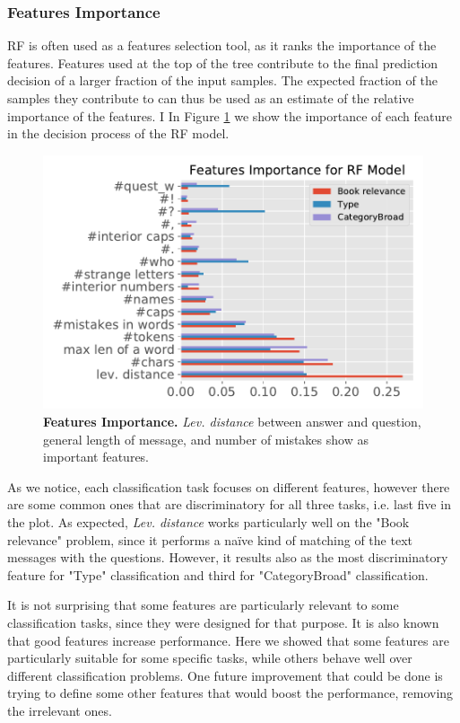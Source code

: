 \documentclass[11pt,a4paper]{article}
\begin{document}
\subsubsection{Features Importance}
RF is often used as a features selection tool, as it ranks the importance of the features. Features used at the top of the tree contribute to the final prediction decision of a larger fraction of the input samples. The expected fraction of the samples they contribute to can thus be used as an estimate of the relative importance of the features. I In Figure \ref{fig:ft_imp_RF} we show the importance of each feature in the decision process of the RF model.

\begin{figure}[tbh]
    \centering
    \includegraphics[width = \linewidth]{../results/features_imp_RF_plot.pdf}
    \caption{\textbf{Features Importance.} \textit{Lev. distance} between answer and question, general length of message, and number of mistakes show as important features.}
    \label{fig:ft_imp_RF}
\end{figure}

As we notice, each classification task focuses on different features, however there are some common ones that are discriminatory for all three tasks, i.e. last five in the plot. As expected, \textit{Lev. distance} works particularly well on the "Book relevance" problem, since it performs a naïve kind of matching of the text messages with the questions. However, it results also as the most discriminatory feature for "Type" classification and third for "CategoryBroad" classification.

It is not surprising that some features are particularly relevant to some classification tasks, since they were designed for that purpose. It is also known that good features increase performance. Here we showed that some features are particularly suitable for some specific tasks, while others behave well over different classification problems. One future improvement that could be done is trying to define some other features that would boost the performance, removing the irrelevant ones.
\end{document}
